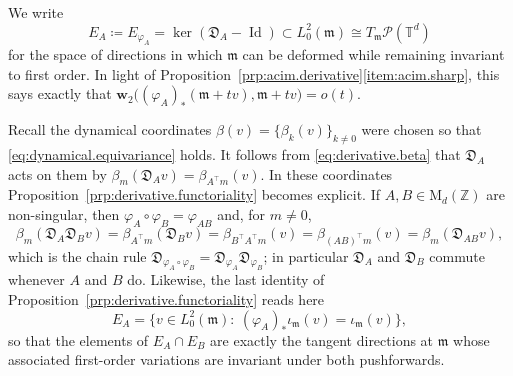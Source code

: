 \documentclass[11pt,reqno]{amsart}
\theoremstyle{plain}
\theoremstyle{definition}
\newcommand{\dw}{\mathbf{w}_2}
\newcommand{\T}{\mathbb{T}}
\newcommand{\Z}{\mathbb{Z}}
\newcommand{\Leb}{\mathfrak{m}}
\newcommand{\D}{\mathfrak{D}}
\newcommand{\Prob}{\mathcal{P}}
\DeclareMathOperator{\Id}{Id}
\begin{document}
We write
\[
    E_A\coloneqq E_{\varphi_A}=\ker\left(\D_A-\Id\right)\subset L^2_0(\Leb)\cong T_\Leb\Prob(\T^d)
\]
for the space of directions in which \(\Leb\) can be deformed while remaining invariant to first order.
In light of Proposition~\ref{prp:acim.derivative}\ref{item:acim.sharp}, this says exactly that \(\dw\big((\varphi_A)_\ast(\Leb+tv),\Leb+tv\big)=o(t)\).

Recall the dynamical coordinates \( \beta(v)=\{\beta_k(v)\}_{k\neq0} \) were chosen so that \eqref{eq:dynamical.equivariance} holds.
It follows from \eqref{eq:derivative.beta} that \( \D_A \) acts on them by \( \beta_m(\D_Av)=\beta_{A^{\top}m}(v) \).
In these coordinates Proposition~\ref{prp:derivative.functoriality} becomes explicit.
If \( A,B\in\mathrm M_d(\Z) \) are non-singular, then \( \varphi_A\circ\varphi_B=\varphi_{AB} \) and, for \( m\neq0 \),
\[
    \beta_m\left(\D_A\D_Bv\right)
    =\beta_{A^{\top}m}\left(\D_Bv\right)
    =\beta_{B^{\top}A^{\top}m}(v)
    =\beta_{(AB)^{\top}m}(v)
    =\beta_m\left(\D_{AB}v\right),
\]
which is the chain rule \( \D_{\varphi_A\circ\varphi_B}=\D_{\varphi_A}\D_{\varphi_B} \); in particular \( \D_A \) and \( \D_B \) commute whenever \( A \) and \( B \) do.
Likewise, the last identity of Proposition~\ref{prp:derivative.functoriality} reads here
\[
    E_A=\big\{v\in L^2_0(\Leb):\ (\varphi_A)_\ast\iota_\Leb(v)=\iota_\Leb(v)\big\},
\]
so that the elements of \( E_A\cap E_B \) are exactly the tangent directions at \( \Leb \) whose associated first-order variations are invariant under both pushforwards.
\end{document}

